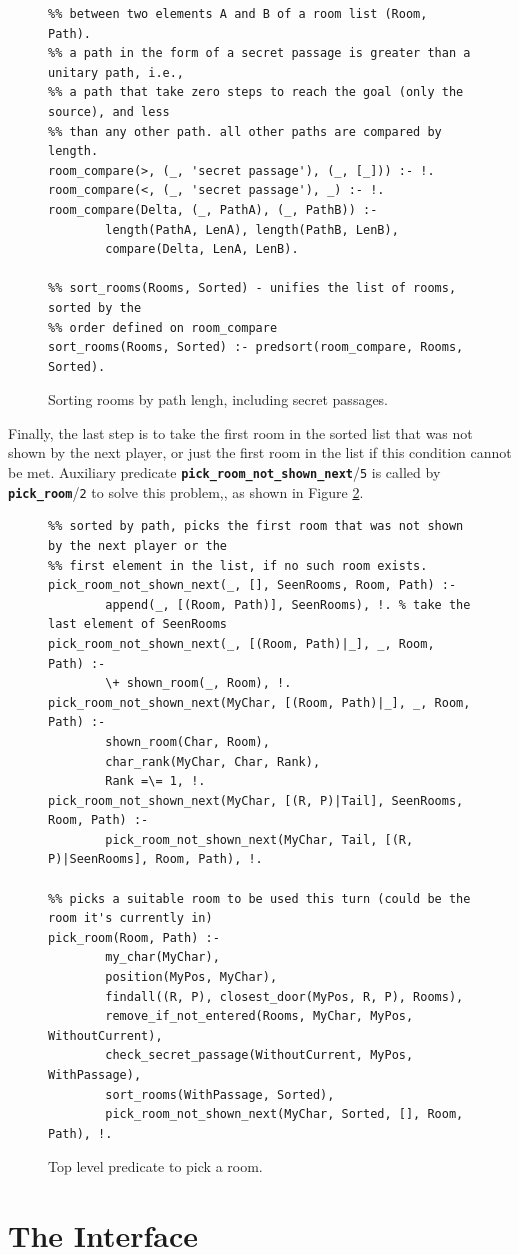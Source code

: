 \documentclass[12pt,a4paper]{article}
\newcommand{\varname}[1]{\texttt{#1}}
\newcommand{\varnamebf}[1]{\textbf{\texttt{#1}}}
\newcommand{\predprot}[2]{{\color{MidnightBlue}\varnamebf{#1}}/{\color{Mulberry}\varname{#2}}}
\begin{document}
\begin{figure}[H]
	\centering
\begin{lstlisting}[style=Prolog-pygsty]
%% room_compare(Order, A, B) - unifies Order to the relative order (<, >, =)
%% between two elements A and B of a room list (Room, Path).
%% a path in the form of a secret passage is greater than a unitary path, i.e.,
%% a path that take zero steps to reach the goal (only the source), and less
%% than any other path. all other paths are compared by length.
room_compare(>, (_, 'secret passage'), (_, [_])) :- !.
room_compare(<, (_, 'secret passage'), _) :- !.
room_compare(Delta, (_, PathA), (_, PathB)) :-
		length(PathA, LenA), length(PathB, LenB),
		compare(Delta, LenA, LenB).

%% sort_rooms(Rooms, Sorted) - unifies the list of rooms, sorted by the
%% order defined on room_compare
sort_rooms(Rooms, Sorted) :- predsort(room_compare, Rooms, Sorted).
\end{lstlisting}
	\caption{Sorting rooms by path lengh, including secret passages.} 
	\label{fig:sort-rooms}
\end{figure}

Finally, the last step is to take the first room in the sorted list that was not shown by the next player, or just the first room in the list if this condition cannot be met. Auxiliary predicate \predprot{pick\_room\_not\_shown\_next}{5} is called by \predprot{pick\_room}{2} to solve this problem,, as shown in Figure \ref{fig:pick-room}.

\begin{figure}[H]
	\centering
\begin{lstlisting}[style=Prolog-pygsty]
%% pick_room_not_shown_next(MyChar, Rooms, SeenRooms, Room, Path) - given Rooms, a list of (Room, Path)
%% sorted by path, picks the first room that was not shown by the next player or the
%% first element in the list, if no such room exists.
pick_room_not_shown_next(_, [], SeenRooms, Room, Path) :-
		append(_, [(Room, Path)], SeenRooms), !. % take the last element of SeenRooms
pick_room_not_shown_next(_, [(Room, Path)|_], _, Room, Path) :-
		\+ shown_room(_, Room), !.
pick_room_not_shown_next(MyChar, [(Room, Path)|_], _, Room, Path) :-
		shown_room(Char, Room),
		char_rank(MyChar, Char, Rank),
		Rank =\= 1, !.
pick_room_not_shown_next(MyChar, [(R, P)|Tail], SeenRooms, Room, Path) :-
		pick_room_not_shown_next(MyChar, Tail, [(R, P)|SeenRooms], Room, Path), !.

%% picks a suitable room to be used this turn (could be the room it's currently in)
pick_room(Room, Path) :-
		my_char(MyChar),
		position(MyPos, MyChar),
		findall((R, P), closest_door(MyPos, R, P), Rooms),
		remove_if_not_entered(Rooms, MyChar, MyPos, WithoutCurrent),
		check_secret_passage(WithoutCurrent, MyPos, WithPassage),
		sort_rooms(WithPassage, Sorted),
		pick_room_not_shown_next(MyChar, Sorted, [], Room, Path), !.
\end{lstlisting}
	\caption{Top level predicate to pick a room.} 
	\label{fig:pick-room}
\end{figure}

\section{The Interface}
\label{sec:interface}
\end{document}
